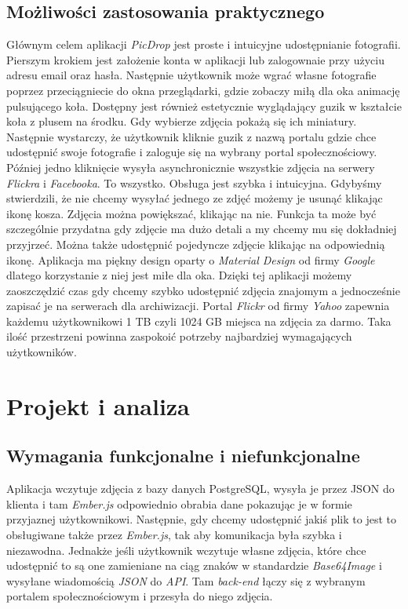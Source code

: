\documentclass[openright]{xmgr}
\begin{document}
\section{Możliwości zastosowania praktycznego}
Głównym celem aplikacji \textit{PicDrop} jest proste i intuicyjne udostępnianie fotografii. Pierszym krokiem jest założenie konta w aplikacji lub zalogownaie przy użyciu adresu email oraz hasła. Następnie użytkownik może wgrać własne fotografie poprzez przeciągniecie do okna przeglądarki, gdzie zobaczy miłą dla oka animację pulsującego koła. Dostępny jest również estetycznie wyglądający guzik w kształcie koła z plusem na środku. Gdy wybierze zdjęcia pokażą się ich miniatury. Następnie wystarczy, że użytkownik kliknie guzik z nazwą portalu gdzie chce udostępnić swoje fotografie i zaloguje się na wybrany portal społecznościowy. Później jedno kliknięcie wysyła asynchronicznie wszystkie zdjęcia na serwery \textit{Flickra} i \textit{Facebooka}. To wszystko. Obsługa jest szybka i intuicyjna. Gdybyśmy stwierdzili, że nie chcemy wysyłać jednego ze zdjęć możemy je usunąć klikając ikonę kosza. Zdjęcia można powiększać, klikając na nie. Funkcja ta może być szczególnie przydatna gdy zdjęcie ma dużo detali a my chcemy mu się dokładniej przyjrzeć. Można także udostępnić pojedyncze zdjęcie klikając na  odpowiednią ikonę. Aplikacja ma piękny design oparty o \textit{Material Design} od firmy \textit{Google} dlatego korzystanie z niej jest miłe dla oka. Dzięki tej aplikacji możemy zaoszczędzić czas gdy chcemy szybko udostępnić zdjęcia znajomym a jednocześnie zapisać je na serwerach dla archiwizacji. Portal \textit{Flickr} od firmy \textit{Yahoo} zapewnia każdemu użytkownikowi 1 TB czyli 1024 GB miejsca na zdjęcia za darmo. Taka ilość przestrzeni powinna zaspokoić potrzeby najbardziej wymagających użytkowników.

\chapter{Projekt i analiza}
\section{Wymagania funkcjonalne i niefunkcjonalne}
Aplikacja wczytuje zdjęcia z bazy danych PostgreSQL, wysyła je przez JSON do klienta i tam \textit{Ember.js} odpowiednio obrabia dane pokazując je w formie przyjaznej użytkownikowi. Następnie, gdy chcemy udostępnić jakiś plik to jest to obsługiwane także przez \textit{Ember.js}, tak aby komunikacja była szybka i niezawodna. Jednakże jeśli użytkownik wczytuje własne zdjęcia, które chce udostępnić to są one zamieniane na ciąg znaków w standardzie \textit{Base64Image} i wysyłane wiadomością \textit{JSON} do \textit{API}. Tam \textit{back-end} łączy się z wybranym portalem społecznościowym i przesyła do niego zdjęcia.
\end{document}
